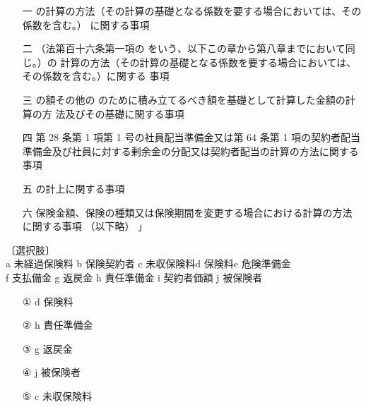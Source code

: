 \documentclass[report,gutter=10mm,fore-edge=10mm,uplatex,dvipdfmx]{jlreq}
\begin{document}
\begin{itemize}
\item[ 一]   の計算の方法（その計算の基礎となる係数を要する場合においては、その係数を含む。） に関する事項
\item[ 二]   （法第百十六条第一項の  をいう、以下この章から第八章までにおいて同じ。）の 計算の方法（その計算の基礎となる係数を要する場合においては、その係数を含む。）に関する 事項
\item[ 三]   の額その他の  のために積み立てるべき額を基礎として計算した金額の計算の方 法及びその基礎に関する事項
\item[ 四]  第 28 条第 1 項第 1 号の社員配当準備金又は第 64 条第 1 項の契約者配当準備金及び社員に対する剰余金の分配又は契約者配当の計算の方法に関する事項
\item[ 五]   の計上に関する事項
\item[ 六]  保険金額、保険の種類又は保険期間を変更する場合における計算の方法に関する事項
 （以下略） 」
\end{itemize}

〔選択肢〕\\
a 未経過保険料 b 保険契約者 c 未収保険料d 保険料e 危険準備金\\
f 支払備金 g 返戻金 h 責任準備金 i 契約者価額 j 被保険者
\answer{}

\begin{itemize}
\item[ ① ] d 保険料
\item[ ② ] h 責任準備金
\item[ ③ ] g 返戻金
\item[ ④ ]  j 被保険者
\item[ ⑤ ] c 未収保険料
\end{itemize}
\end{document}
